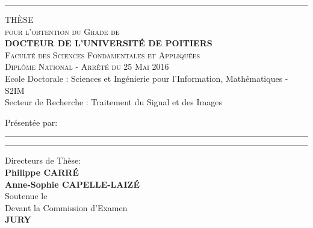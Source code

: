 \makeatletter
  \begin{titlepage}
\thispagestyle{empty}
  \vspace{-2cm}
  \begin{center}
 \rule[0.5ex]{\textwidth}{0.1mm}

\end{center}
  \centering
  \vspace{0.4cm}
  
      {\large \textsc{THÈSE} \vspace{0.2cm}}\\
      \textsc{pour l'obtention du Grade de\\ \vspace{0.2cm}
      \textbf{DOCTEUR DE L'UNIVERSITÉ DE POITIERS}\\
      \vspace{0.3cm}
      Faculté des Sciences Fondamentales et Appliquées\\
Diplôme National - Arrêté du 25 Mai 2016\\
}
 \vspace{0.5cm}
\small
{Ecole Doctorale : Sciences et Ingénierie pour l'Information, Mathématiques - S2IM \\
Secteur de Recherche : Traitement du Signal et des Images\\ \vspace{1cm}}

Présentée par:\\
\large
\textbf{\Author}

    \vspace{0.5cm}
    
\rule{\linewidth}{2pt}

\textbf{\Title}
\rule{\linewidth}{2pt}
      
      {\small  \vspace{0.5cm} Directeurs de Thèse:\\
      
\textbf{Philippe CARR\'E\\Anne-Sophie CAPELLE-LAIZ\'E} \\  \vspace{0.6cm}
Soutenue le \DateSoutenance \\
Devant la Commission d’Examen }
\vspace{0.5cm} \\
\textbf{\large JURY} \\
\vspace{0.4cm}
\small


\end{titlepage}
